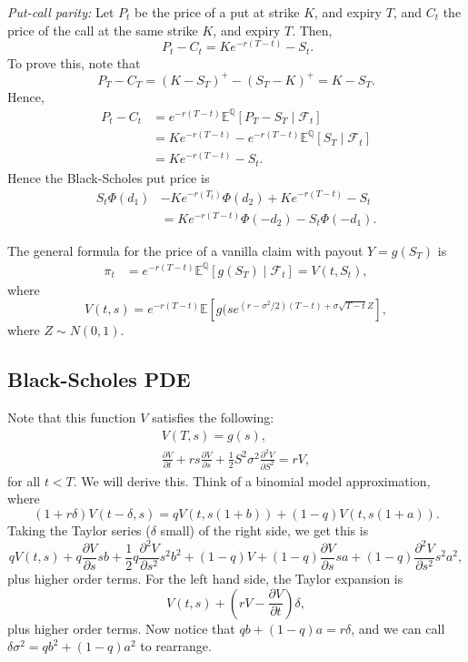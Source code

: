 \documentclass[12pt]{article}
\begin{document}
\emph{Put-call parity:} Let $P_t$ be the price of a put at strike $K$, and expiry $T$, and $C_t$ the price of the call at the same strike $K$, and expiry $T$. Then,
\[\
	P_t - C_t = K e^{-r(T - t)} - S_t.
\]
To prove this, note that
\[
P_T - C_T = (K - S_T)^{+} - (S_T - K)^{+} = K - S_T.
\]
Hence,
\begin{align*}
	P_t - C_t &= e^{-r(T - t)} \mathbb{E}^{\mathbb{Q}}[P_T - S_T \mid \mathcal{F}_t] \\
		  &= K e^{-r(T - t)} - e^{-r(T - t)} \mathbb{E}^{\mathbb{Q}}[S_T \mid \mathcal{F}_t] \\
		  &= K e^{-r(T - t)} - S_t.
\end{align*}
Hence the Black-Scholes put price is
\begin{align*}
	S_t \Phi(d_1) &- K e^{-r(T _ t)}\Phi(d_2) + K e^{-r(T - t)} - S_t \\
		      &= Ke^{-r(T - t)} \Phi(-d_2) - S_t \Phi(-d_1).
\end{align*}

The general formula for the price of a vanilla claim with payout $Y = g(S_T)$ is
\begin{align*}
	\pi_t &= e^{-r(T - t)} \mathbb{E}^{\mathbb{Q}}[g(S_T) \mid \mathcal{F}_t] = V(t, S_t),
\end{align*}
where
\[
	V(t, s) = e^{-r(T - t)} \mathbb{E}[g(s e^{(r - \sigma^2/2)(T -t) + \sigma\sqrt{T - t} Z}],
\]
where $Z \sim N(0, 1)$.


\subsection{Black-Scholes PDE}%
\label{sub:bs_pde}

Note that this function $V$ satisfies the following:
\begin{align*}
	V(T, s) = g(s), \\
	\frac{\partial V}{\partial t} + r s \frac{\partial V}{\partial s} + \frac{1}{2} S^2\sigma^2 \frac{\partial^2 V}{\partial S^2} = rV,
\end{align*}
for all $t < T$. We will derive this. Think of a binomial model approximation, where
\[
	(1 + r \delta) V(t - \delta, s) = q V(t, s(1+b)) + (1 - q)V(t, s(1+a)).
\]
Taking the Taylor series ($\delta$ small) of the right side, we get this is
\[
qV(t, s) + q \frac{\partial V}{\partial s} s b + \frac{1}{2} q \frac{\partial^2 V}{\partial s^2} s^2 b^2 + (1 - q)V + (1 - q) \frac{\partial V}{\partial s} sa + (1 - q) \frac{\partial^2 V}{\partial s^2} s^2 a^2,
\]
plus higher order terms. For the left hand side, the Taylor expansion is
\[
V(t, s) + \left(rV - \frac{\partial V}{\partial t} \right) \delta,
\]
plus higher order terms. Now notice that $qb + (1 - q)a = r \delta$, and we can call $\delta\sigma^2 = q b^2 + (1 - q)a^2$ to rearrange.
\end{document}
